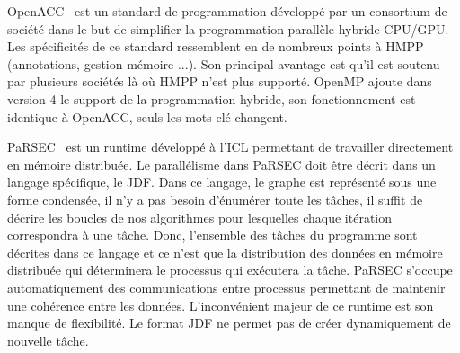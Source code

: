 OpenACC~\cite{OpenACC} est un standard de programmation développé par un consortium de société dans le but de simplifier la programmation parallèle hybride CPU/GPU.
%
Les spécificités de ce standard ressemblent en de nombreux points à HMPP (annotations, gestion mémoire ...).
%
Son principal avantage est qu'il est soutenu par plusieurs sociétés là où HMPP n'est plus supporté.
%
OpenMP ajoute dans version 4 le support de la programmation hybride, son fonctionnement est identique à OpenACC, seuls les mots-clé changent.



PaRSEC~\cite{PaRSEC} est un runtime développé à l'ICL permettant de travailler directement en mémoire distribuée.
%
Le parallélisme dans PaRSEC doit être décrit dans un langage spécifique, le JDF.
%
Dans ce langage, le graphe est représenté sous une forme condensée, il n'y a pas besoin d'énumérer toute les tâches, il suffit de décrire les boucles de nos algorithmes pour lesquelles chaque itération correspondra à une tâche.
%
Donc, l'ensemble des tâches du programme sont décrites dans ce langage et ce n'est que la distribution des données en mémoire distribuée qui déterminera le processus qui exécutera la tâche.
%
PaRSEC s'occupe automatiquement des communications entre processus permettant de maintenir une cohérence entre les données.
%
L'inconvénient majeur de ce runtime est son manque de flexibilité.
%
Le format JDF ne permet pas de créer dynamiquement de nouvelle tâche.
